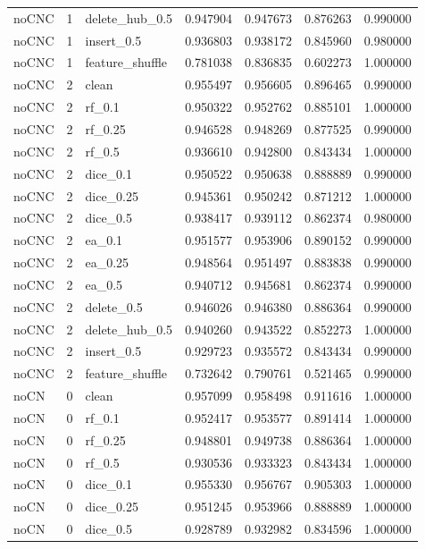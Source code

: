 \documentclass[UTF8,a4paper,11pt,fontset=fandol]{ctexart}
\begin{document}
{\begin{longtable}{lrlrrrr}
noCNC & 1 & delete\_hub\_0.5 & 0.947904 & 0.947673 & 0.876263 & 0.990000 \\
noCNC & 1 & insert\_0.5 & 0.936803 & 0.938172 & 0.845960 & 0.980000 \\
noCNC & 1 & feature\_shuffle & 0.781038 & 0.836835 & 0.602273 & 1.000000 \\
noCNC & 2 & clean & 0.955497 & 0.956605 & 0.896465 & 0.990000 \\
noCNC & 2 & rf\_0.1 & 0.950322 & 0.952762 & 0.885101 & 1.000000 \\
noCNC & 2 & rf\_0.25 & 0.946528 & 0.948269 & 0.877525 & 0.990000 \\
noCNC & 2 & rf\_0.5 & 0.936610 & 0.942800 & 0.843434 & 1.000000 \\
noCNC & 2 & dice\_0.1 & 0.950522 & 0.950638 & 0.888889 & 0.990000 \\
noCNC & 2 & dice\_0.25 & 0.945361 & 0.950242 & 0.871212 & 1.000000 \\
noCNC & 2 & dice\_0.5 & 0.938417 & 0.939112 & 0.862374 & 0.980000 \\
noCNC & 2 & ea\_0.1 & 0.951577 & 0.953906 & 0.890152 & 0.990000 \\
noCNC & 2 & ea\_0.25 & 0.948564 & 0.951497 & 0.883838 & 0.990000 \\
noCNC & 2 & ea\_0.5 & 0.940712 & 0.945681 & 0.862374 & 0.990000 \\
noCNC & 2 & delete\_0.5 & 0.946026 & 0.946380 & 0.886364 & 0.990000 \\
noCNC & 2 & delete\_hub\_0.5 & 0.940260 & 0.943522 & 0.852273 & 1.000000 \\
noCNC & 2 & insert\_0.5 & 0.929723 & 0.935572 & 0.843434 & 0.990000 \\
noCNC & 2 & feature\_shuffle & 0.732642 & 0.790761 & 0.521465 & 0.990000 \\
noCN & 0 & clean & 0.957099 & 0.958498 & 0.911616 & 1.000000 \\
noCN & 0 & rf\_0.1 & 0.952417 & 0.953577 & 0.891414 & 1.000000 \\
noCN & 0 & rf\_0.25 & 0.948801 & 0.949738 & 0.886364 & 1.000000 \\
noCN & 0 & rf\_0.5 & 0.930536 & 0.933323 & 0.843434 & 1.000000 \\
noCN & 0 & dice\_0.1 & 0.955330 & 0.956767 & 0.905303 & 1.000000 \\
noCN & 0 & dice\_0.25 & 0.951245 & 0.953966 & 0.888889 & 1.000000 \\
noCN & 0 & dice\_0.5 & 0.928789 & 0.932982 & 0.834596 & 1.000000 \\

\end{longtable}}
\end{document}
